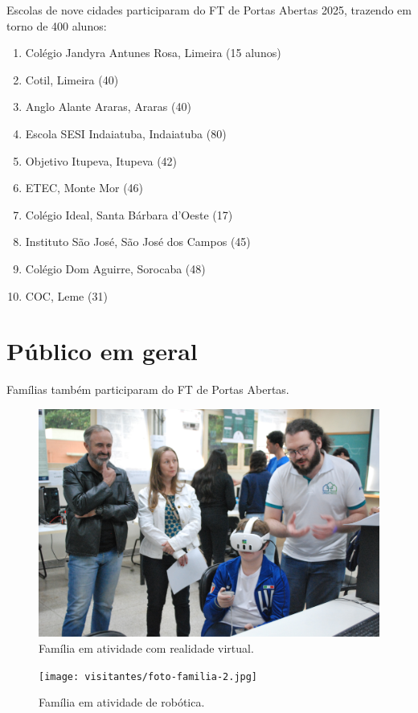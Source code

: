 \documentclass[
  letterpaper,
  DIV=11,
  numbers=noendperiod]{scrreprt}
\begin{document}
Escolas de nove cidades participaram do FT de Portas Abertas 2025,
trazendo em torno de 400 alunos:

\begin{enumerate}
\def\labelenumi{\arabic{enumi}.}
\item
  Colégio Jandyra Antunes Rosa, Limeira (15 alunos)
\item
  Cotil, Limeira (40)
\item
  Anglo Alante Araras, Araras (40)
\item
  Escola SESI Indaiatuba, Indaiatuba (80)
\item
  Objetivo Itupeva, Itupeva (42)
\item
  ETEC, Monte Mor (46)
\item
  Colégio Ideal, Santa Bárbara d'Oeste (17)
\item
  Instituto São José, São José dos Campos (45)
\item
  Colégio Dom Aguirre, Sorocaba (48)
\item
  COC, Leme (31)
\end{enumerate}

\section{Público em geral}\label{puxfablico-em-geral}

Famílias também participaram do FT de Portas Abertas.

\begin{figure}[H]

{\centering \includegraphics[width=0.7\linewidth,height=\textheight,keepaspectratio]{visitantes/foto-familia.jpg}

}

\caption{Família em atividade com realidade virtual.}

\end{figure}%

\begin{figure}[H]

{\centering \texttt{[image: visitantes/foto-familia-2.jpg]}

}

\caption{Família em atividade de robótica.}

\end{figure}%
\end{document}
